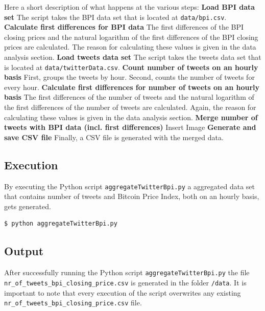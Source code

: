 \documentclass[a4paper,12pt]{article}
\begin{document}
\begin{spacing}{1.2}
Here a short description of what happens at the various steps: 
\linebreak\linebreak
\textbf{Load BPI data set} The script takes the BPI data set that is located at \verb|data/bpi.csv|.
\linebreak\linebreak
\textbf{Calculate first differences for BPI data} The first differences of the BPI closing prices and the natural logarithm of the first differences of the BPI closing prices are calculated. The reason for calculating these values is given in the data analysis section.
\linebreak\linebreak
\textbf{Load tweets data set} The script takes the tweets data set that is located at \verb|data/twitterData.csv|.
\linebreak\linebreak
\textbf{Count number of tweets on an hourly basis} First, groups the tweets by hour. Second, counts the number of tweets for every hour.
\linebreak\linebreak
\textbf{Calculate first differences for number of tweets on an hourly basis} The first differences of the number of tweets and the natural logarithm of the first differences of the number of tweets are calculated. Again, the reason for calculating these values is given in the data analysis section.
\linebreak\linebreak
\textbf{Merge number of tweets with BPI data (incl. first differences)} 
Insert Image
\linebreak\linebreak
\textbf{Generate and save CSV file} Finally, a CSV file is generated with the merged data. 

\subsection{Execution}
By executing the Python script \verb|aggregateTwitterBpi.py| a aggregated data set that contains number of tweets and Bitcoin Price Index, both on an hourly basis, gets generated. 
\begin{lstlisting}[language=bash]
    $ python aggregateTwitterBpi.py
\end{lstlisting}

\subsection{Output}
After successfully running the Python script \verb|aggregateTwitterBpi.py| the file \verb|nr_of_tweets_bpi_closing_price.csv| is generated in the folder \verb|/data|. It is important to note that every execution of the script overwrites any existing \verb|nr_of_tweets_bpi_closing_price.csv| file.


\end{spacing}
\end{document}
